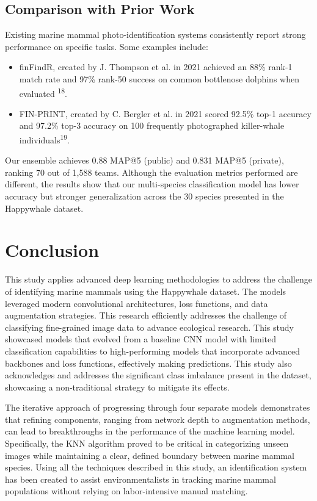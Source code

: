 \documentclass[twocolumn]{article}
\begin{document}
\subsection{Comparison with Prior Work}

Existing marine mammal photo-identification systems consistently report strong performance on specific tasks. Some examples include: 
\begin{itemize}
    \item finFindR, created by J. Thompson et al. in 2021 achieved an 88\% rank-1 match rate and 97\% rank-50 success on common bottlenose dolphins when evaluated \textsuperscript{18}.
    \item FIN-PRINT, created by C. Bergler et al. in 2021 scored 92.5\% top-1 accuracy and 97.2\% top-3 accuracy on 100 frequently photographed killer-whale individuals\textsuperscript{19}.
\end{itemize}

Our ensemble achieves 0.88 MAP@5 (public) and 0.831 MAP@5 (private), ranking 70 out of 1,588 teams. Although the evaluation metrics performed are different, the results show that our multi-species classification model has lower accuracy but stronger generalization across the 30 species presented in the Happywhale dataset.

\section{Conclusion}

This study applies advanced deep learning methodologies to address the challenge of identifying marine mammals using the Happywhale dataset. The models leveraged modern convolutional architectures, loss functions, and data augmentation strategies. This research efficiently addresses the challenge of classifying fine-grained image data to advance ecological research. This study showcased models that evolved from a baseline CNN model with limited classification capabilities to high-performing models that incorporate advanced backbones and loss functions, effectively making predictions. This study also acknowledges and addresses the significant class imbalance present in the dataset, showcasing a non-traditional strategy to mitigate its effects.  

The iterative approach of progressing through four separate models demonstrates that refining components, ranging from network depth to augmentation methods, can lead to breakthroughs in the performance of the machine learning model. Specifically, the KNN algorithm proved to be critical in categorizing unseen images while maintaining a clear, defined boundary between marine mammal species. Using all the techniques described in this study, an identification system has been created to assist environmentalists in tracking marine mammal populations without relying on labor-intensive manual matching.
\end{document}
